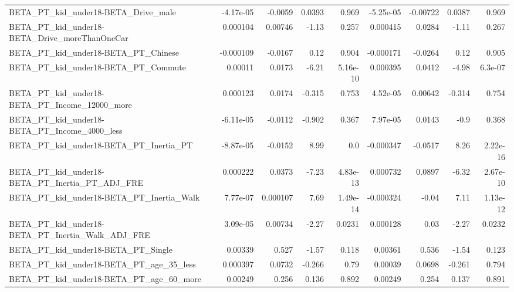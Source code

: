 \begin{tabular}{lrrrrrrrr}
BETA\_PT\_kid\_under18-BETA\_Drive\_male                &   -4.17e-05 &      -0.0059 &   0.0393 &    0.969 &  -5.25e-05 &    -0.00722 &       0.0387 &         0.969 \\
BETA\_PT\_kid\_under18-BETA\_Drive\_moreThanOneCar      &    0.000104 &      0.00746 &    -1.13 &    0.257 &   0.000415 &      0.0284 &        -1.11 &         0.267 \\
BETA\_PT\_kid\_under18-BETA\_PT\_Chinese                &   -0.000109 &      -0.0167 &     0.12 &    0.904 &  -0.000171 &     -0.0264 &         0.12 &         0.905 \\
BETA\_PT\_kid\_under18-BETA\_PT\_Commute                &     0.00011 &       0.0173 &    -6.21 & 5.16e-10 &   0.000395 &      0.0412 &        -4.98 &       6.3e-07 \\
BETA\_PT\_kid\_under18-BETA\_PT\_Income\_12000\_more      &    0.000123 &       0.0174 &   -0.315 &    0.753 &   4.52e-05 &     0.00642 &       -0.314 &         0.754 \\
BETA\_PT\_kid\_under18-BETA\_PT\_Income\_4000\_less       &   -6.11e-05 &      -0.0112 &   -0.902 &    0.367 &   7.97e-05 &      0.0143 &         -0.9 &         0.368 \\
BETA\_PT\_kid\_under18-BETA\_PT\_Inertia\_PT             &   -8.87e-05 &      -0.0152 &     8.99 &      0.0 &  -0.000347 &     -0.0517 &         8.26 &      2.22e-16 \\
BETA\_PT\_kid\_under18-BETA\_PT\_Inertia\_PT\_ADJ\_FRE     &    0.000222 &       0.0373 &    -7.23 & 4.83e-13 &   0.000732 &      0.0897 &        -6.32 &      2.67e-10 \\
BETA\_PT\_kid\_under18-BETA\_PT\_Inertia\_Walk           &    7.77e-07 &     0.000107 &     7.69 & 1.49e-14 &  -0.000324 &       -0.04 &         7.11 &      1.13e-12 \\
BETA\_PT\_kid\_under18-BETA\_PT\_Inertia\_Walk\_ADJ\_FRE   &    3.09e-05 &      0.00734 &    -2.27 &   0.0231 &   0.000128 &        0.03 &        -2.27 &        0.0232 \\
BETA\_PT\_kid\_under18-BETA\_PT\_Single                 &     0.00339 &        0.527 &    -1.57 &    0.118 &    0.00361 &       0.536 &        -1.54 &         0.123 \\
BETA\_PT\_kid\_under18-BETA\_PT\_age\_35\_less            &    0.000397 &       0.0732 &   -0.266 &     0.79 &    0.00039 &      0.0698 &       -0.261 &         0.794 \\
BETA\_PT\_kid\_under18-BETA\_PT\_age\_60\_more            &     0.00249 &        0.256 &    0.136 &    0.892 &    0.00249 &       0.254 &        0.137 &         0.891 \\

\end{tabular}
